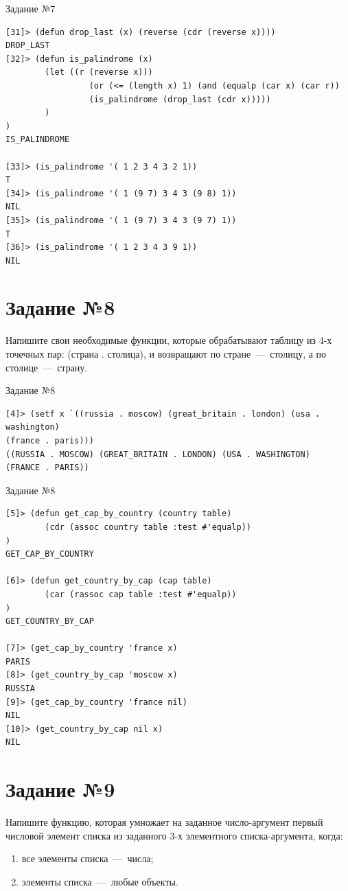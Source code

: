 \begin{code}
\caption{Задание №7}
\label{code:bf4}
\begin{verbatim}
[31]> (defun drop_last (x) (reverse (cdr (reverse x))))
DROP_LAST
[32]> (defun is_palindrome (x)
        (let ((r (reverse x)))
                 (or (<= (length x) 1) (and (equalp (car x) (car r)) 
                 (is_palindrome (drop_last (cdr x)))))
        )
)
IS_PALINDROME

[33]> (is_palindrome '( 1 2 3 4 3 2 1))
T
[34]> (is_palindrome '( 1 (9 7) 3 4 3 (9 8) 1))
NIL
[35]> (is_palindrome '( 1 (9 7) 3 4 3 (9 7) 1))
T
[36]> (is_palindrome '( 1 2 3 4 3 9 1))
NIL
\end{verbatim}
\end{code}

\section{Задание №8}
Напишите свои необходимые функции, которые обрабатывают таблицу из 4-х точечных пар: (страна . столица), и возвращают по стране~---~столицу, а по столице~---~страну.

\begin{code}
\caption{Задание №8}
\label{code:bf4}
\begin{verbatim}
[4]> (setf x `((russia . moscow) (great_britain . london) (usa . washington) 
(france . paris)))
((RUSSIA . MOSCOW) (GREAT_BRITAIN . LONDON) (USA . WASHINGTON)
(FRANCE . PARIS))
\end{verbatim}
\end{code}

\newpage

\begin{code}
\caption{Задание №8}
\label{code:bf4}
\begin{verbatim}
[5]> (defun get_cap_by_country (country table)
        (cdr (assoc country table :test #'equalp))
)
GET_CAP_BY_COUNTRY

[6]> (defun get_country_by_cap (cap table)
        (car (rassoc cap table :test #'equalp))
)
GET_COUNTRY_BY_CAP

[7]> (get_cap_by_country 'france x)
PARIS
[8]> (get_country_by_cap 'moscow x)
RUSSIA
[9]> (get_cap_by_country 'france nil)
NIL
[10]> (get_country_by_cap nil x)
NIL
\end{verbatim}
\end{code}

\section{Задание №9}
Напишите функцию, которая умножает на заданное число-аргумент первый числовой элемент списка из заданного 3-х элементного списка-аргумента, когда:
\begin{enumerate}
	\item все элементы списка~---~числа;
	\item элементы списка~---~любые объекты.
\end{enumerate}

